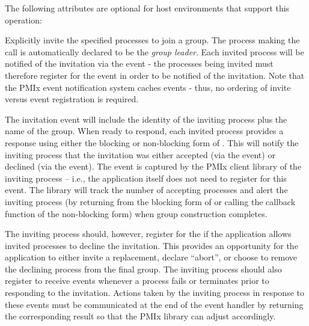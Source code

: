 \reqattrend

\optattrstart
The following attributes are optional for host environments that support this operation:


\optattrend

\descr

Explicitly invite the specified processes to join a group. The process making the  call is automatically declared to be the \emph{group leader}. Each invited process will be notified of the invitation via the  event - the processes being invited must therefore register for the  event in order to be notified of the invitation. Note that the \ac{PMIx} event notification system caches events - thus, no ordering of invite versus event registration is required.

The invitation event will include the identity of the inviting process plus the name of the group. When ready to respond, each invited process provides a response using either the blocking or non-blocking form of . This will notify the inviting process that the invitation was either accepted (via the  event) or declined (via the  event). The  event is captured by the \ac{PMIx} client library of the inviting process – i.e., the application itself does not need to register for this event. The library will track the number of accepting processes and alert the inviting process (by returning from the blocking form of  or calling the callback function of the non-blocking form) when group construction completes.

The inviting process should, however, register for the  if the application allows invited processes to decline the invitation. This provides an opportunity for the application to either invite a replacement, declare ``abort'', or choose to remove the declining process from the final group. The inviting process should also register to receive  events whenever a process fails or terminates prior to responding to the invitation. Actions taken by the inviting process in response to these events must be communicated at the end of the event handler by returning the corresponding result so that the \ac{PMIx} library can adjust accordingly.

